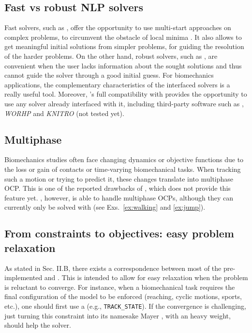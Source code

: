 \subsection{Fast vs robust NLP solvers}

Fast solvers, such as \acados, offer the opportunity to use multi-start approaches on complex problems, to circumvent the obstacle of local minima \cite{huchez2015local, bailly2020optimal}.
It also allows to get meaningful initial solutions from simpler problems, for guiding the resolution of the harder problems.
On the other hand, robust solvers, such as \ipopt, are convenient when the user lacks information about the sought solutions and thus cannot guide the solver through a good initial guess.
For biomechanics applications, the complementary characteristics of the interfaced solvers is a really useful tool.
Moreover, \bioptim's full compatibility with \casadi provides the opportunity to use any solver already interfaced with it, including third-party software such as \snopt \addref, \textit{WORHP} \addref and \textit{KNITRO} \addref (not tested yet). 

\subsection{Multiphase}

Biomechanics studies often face changing dynamics or objective functions due to the loss or gain of contacts or time-varying biomechanical tasks.
When tracking such a motion or trying to predict it, these changes translate into multiphase OCP.
This is one of the reported drawbacks of \moco \addref, which does not provide this feature yet.
\bioptim, however, is able to handle multiphase OCPs, although they can currently only be solved with \ipopt (see Exs.~\ref{ex:walking} and \ref{ex:jump}).


\subsection{From constraints to objectives: easy problem relaxation}

As stated in Sec. II.B, there exists a correspondence between most of the pre-implemented \constraints and \objectives.
This is intended to allow for easy relaxation when the problem is reluctant to converge. 
For instance, when a biomechanical task requires the final configuration of the model to be enforced (reaching, cyclic motions, sports, etc.), one should first use a \constraint (e.g., \texttt{TRACK\_STATE}).
If the convergence is challenging, just turning this constraint into its namesake Mayer \objective, with an heavy weight, should help the solver.

